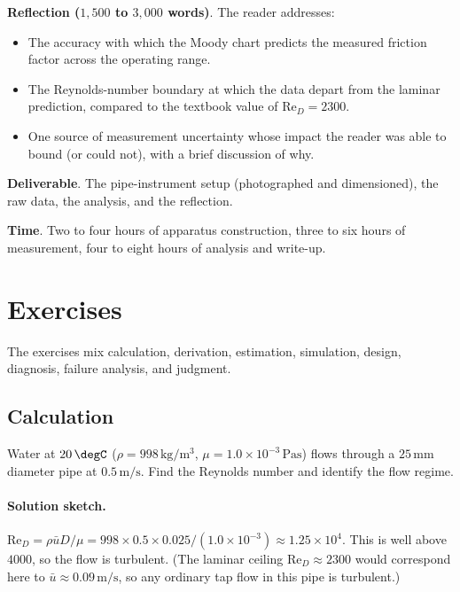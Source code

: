 \begin{project}
\textbf{Reflection ($1{,}500$ to $3{,}000$ words)}. The reader
addresses:

\begin{itemize}[leftmargin=*]
  \item The accuracy with which the Moody chart predicts the
    measured friction factor across the operating range.
  \item The Reynolds-number boundary at which the data depart from
    the laminar prediction, compared to the textbook value of
    $\text{Re}_D = 2300$.
  \item One source of measurement uncertainty whose impact the
    reader was able to bound (or could not), with a brief
    discussion of why.
\end{itemize}

\textbf{Deliverable}. The pipe-instrument setup (photographed and
dimensioned), the raw data, the analysis, and the reflection.

\textbf{Time}. Two to four hours of apparatus construction, three
to six hours of measurement, four to eight hours of analysis and
write-up.
\end{project}

\section{Exercises}

The exercises mix calculation, derivation, estimation, simulation,
design, diagnosis, failure analysis, and judgment.

\subsection*{Calculation}

\begin{exercise}
Water at $20\,\degC$ ($\rho = 998\,\si{\kilogram\per\meter\cubed}$,
$\mu = 1.0\times 10^{-3}\,\si{\pascal\second}$) flows through a
$25\,\si{\milli\meter}$ diameter pipe at $0.5\,\si{\meter\per
\second}$. Find the Reynolds number and identify the flow regime.

\paragraph{Solution sketch.} $\text{Re}_D = \rho\bar u D/\mu =
998\times0.5\times0.025/(1.0\times10^{-3}) \approx 1.25\times10^{4}$.
This is well above $4000$, so the flow is turbulent. (The laminar
ceiling $\text{Re}_D\approx2300$ would correspond here to
$\bar u\approx0.09\,\si{\meter\per\second}$, so any ordinary tap
flow in this pipe is turbulent.)
\end{exercise}

